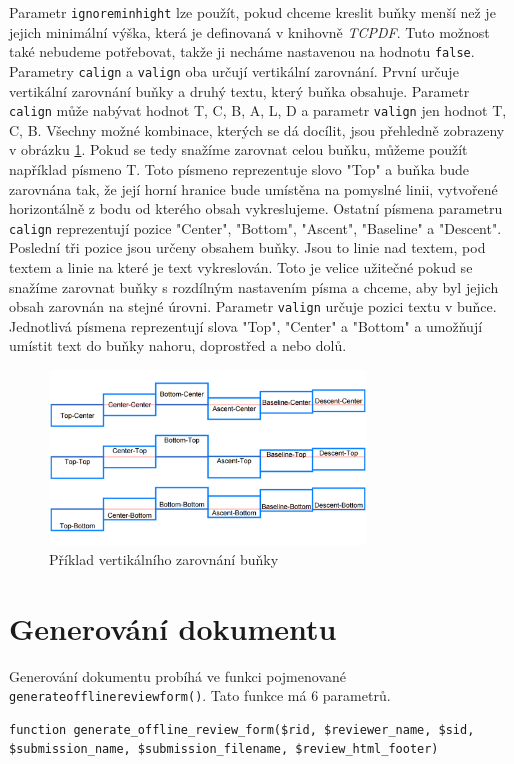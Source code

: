 \documentclass[czech,BP]{thesiskiv}
\begin{document}
Parametr \texttt{ignore\textunderscore min\textunderscore hight} lze použít, pokud chceme kreslit buňky menší než je jejich minimální výška, která je definovaná v knihovně \emph{TCPDF}. Tuto možnost také nebudeme potřebovat, takže ji necháme nastavenou na hodnotu \texttt{false}.
Parametry \texttt{calign} a \texttt{valign} oba určují vertikální zarovnání. První určuje vertikální zarovnání buňky a druhý textu, který buňka obsahuje. Parametr \texttt{calign} může nabývat hodnot T, C, B, A, L, D a parametr \texttt{valign} jen hodnot T, C, B. Všechny možné kombinace, kterých se dá docílit, jsou přehledně zobrazeny v obrázku \ref{zarovnani}. Pokud se tedy snažíme zarovnat celou buňku, můžeme použít například písmeno T. Toto písmeno reprezentuje slovo "Top" a buňka bude zarovnána tak, že její horní hranice bude umístěna na pomyslné linii, vytvořené horizontálně z bodu od kterého obsah vykreslujeme. Ostatní písmena parametru \texttt{calign} reprezentují pozice "Center", "Bottom", "Ascent", "Baseline" a "Descent". Poslední tři pozice jsou určeny obsahem buňky. Jsou to linie nad textem, pod textem a linie na které je text vykreslován. Toto je velice užitečné pokud se snažíme zarovnat buňky s rozdílným nastavením písma a chceme, aby byl jejich obsah zarovnán na stejné úrovni. Parametr \texttt{valign} určuje pozici textu v buňce. Jednotlivá písmena reprezentují slova "Top", "Center" a "Bottom" a umožňují umístit text do buňky nahoru, doprostřed a nebo dolů.
\begin{figure}[h]
    \centering
    \includegraphics[width=0.75\textwidth]{obr1.png}
    \caption{Příklad vertikálního zarovnání buňky}
    \label{zarovnani}
\end{figure}

\section{Generování dokumentu}
Generování dokumentu probíhá ve funkci pojmenované \texttt{generate\textunderscore offline\textunderscore review\textunderscore form()}. Tato funkce má 6 parametrů. 
\label{lst:Generovani}
\begin{lstlisting}
function generate_offline_review_form($rid, $reviewer_name, $sid, $submission_name, $submission_filename, $review_html_footer)
\end{lstlisting}
\end{document}

